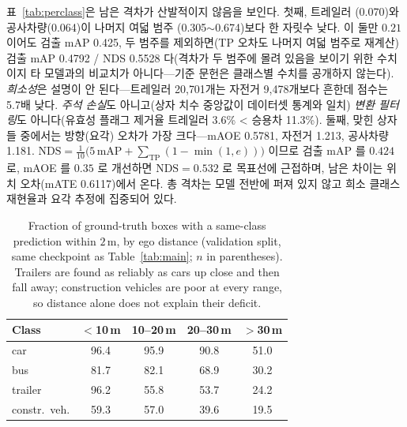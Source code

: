 \documentclass[conference]{IEEEtran}
\newcommand{\measured}[1]{#1}
\begin{document}
표~\ref{tab:perclass}은 남은 격차가 산발적이지 않음을 보인다. 첫째, 트레일러
(\measured{0.070})와 공사차량(\measured{0.064})이 나머지 여덟 범주
(\measured{0.305}$\sim$\measured{0.674})보다 한 자릿수 낮다. 이 둘만 $0.21$ 이어도 검출 mAP
\measured{0.425}, 두 범주를 제외하면(TP 오차도 나머지 여덟 범주로 재계산) 검출 mAP
\measured{0.4792} / NDS \measured{0.5528}
다(격차가 두 범주에 몰려 있음을 보이기 위한 수치이지 타 모델과의 비교치가
아니다---기준 문헌은 클래스별 수치를 공개하지 않는다). \emph{희소성}은 설명이 안 된다---트레일러 \measured{20{,}701}개는
자전거 \measured{9{,}478}개보다 흔한데 점수는 \measured{5.7}배 낮다. \emph{주석 손실}도
아니고(상자 치수 중앙값이 데이터셋 통계와 일치) \emph{변환 필터링}도 아니다(유효성
플래그 제거율 트레일러 \measured{3.6}\% < 승용차 \measured{11.3}\%). 둘째, 맞힌 상자들 중에서는 방향(요각) 오차가 가장 크다---mAOE \measured{0.5781}, 자전거 \measured{1.213}, 공사차량
\measured{1.181}.
$\mathrm{NDS}=\frac{1}{10}\bigl(5\,\mathrm{mAP}+\sum_{\mathrm{TP}}(1-\min(1,e))\bigr)$
이므로 검출 mAP 를 $0.424$ 로, mAOE 를 $0.35$ 로 개선하면
$\mathrm{NDS}=\measured{0.532}$ 로 목표선에 근접하며, 남은 차이는 위치 오차(mATE
\measured{0.6117})에서 온다. 총 격차는 모델 전반에 퍼져 있지 않고 희소
클래스 재현율과 요각 추정에 집중되어 있다.

\begin{table}[t]
\caption{Fraction of ground-truth boxes with a same-class prediction within
$2\,$m, by ego distance (validation split, same checkpoint as
Table~\ref{tab:main}; $n$ in parentheses). Trailers are found as reliably as
cars up close and then fall away; construction vehicles are poor at every
range, so distance alone does not explain their deficit.}
\label{tab:bydist}
\centering
\small
\begin{tabular}{lcccc}
\toprule
Class & $<$10\,m & 10--20\,m & 20--30\,m & $>$30\,m \\
\midrule
car          & \measured{96.4} & \measured{95.9} & \measured{90.8} & \measured{51.0}\\
bus          & \measured{81.7} & \measured{82.1} & \measured{68.9} & \measured{30.2}\\
trailer      & \measured{96.2} & \measured{55.8} & \measured{53.7} & \measured{24.2}\\
constr.\ veh.& \measured{59.3} & \measured{57.0} & \measured{39.6} & \measured{19.5}\\
\bottomrule
\end{tabular}
\end{table}
\end{document}
